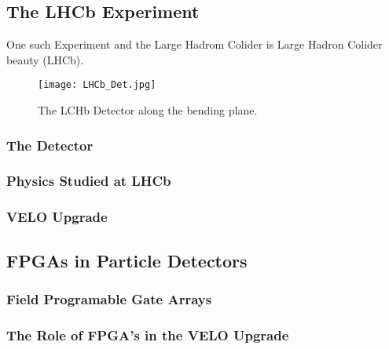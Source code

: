   \subsection{The LHCb Experiment}

    One such Experiment and the Large Hadrom Colider is Large Hadron Colider beauty (LHCb).

    \begin{figure}[h]
      \centering
      \texttt{[image: LHCb\_Det.jpg]}
      \caption{The LCHb Detector along the bending plane.}
      \label{fig:LCHb_Collab}
    \end{figure}

  \subsubsection{The Detector}

  \subsubsection{Physics Studied at LHCb}

  \subsubsection{VELO Upgrade}

  \subsection{FPGAs in Particle Detectors}

  \subsubsection{Field Programable Gate Arrays}

  \subsubsection{The Role of FPGA's in the VELO Upgrade}
